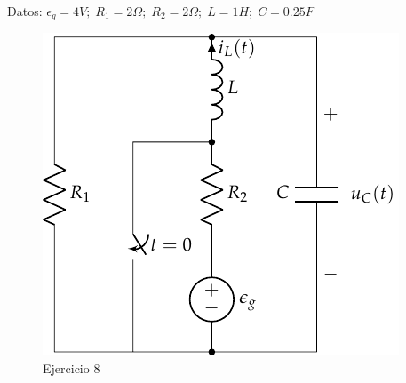 \begin{enumerate}
  Datos:
  $\epsilon_g = 4V;\; R_1 = {2}{\Omega};\; R_2 = {2}{\Omega};\; L =
  {1}{H};\; C = {0.25}{F} $
  \begin{figure}[H]
    \centering \includegraphics{../figs/FM_4_9.pdf}
    \caption{Ejercicio 8}
    \label{fig.FM_4_9}
  \end{figure}


\end{enumerate}
